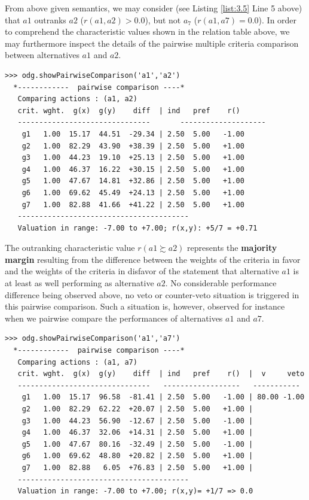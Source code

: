 From above given semantics, we may consider (see Listing \ref{list:3.5} Line 5 above) that $a1$ outranks $a2$ ($r(a1,a2) > 0.0$), but not $a_7$ ($r(a1,a7) = 0.0$). In order to comprehend the characteristic values shown in the relation table above, we may furthermore inspect the details of the pairwise multiple criteria comparison between alternatives $a1$ and $a2$.

\begin{lstlisting}[caption={Inspecting a pairwise multiple criteria comparison},label=list:3.6]
>>> odg.showPairwiseComparison('a1','a2')
  *------------  pairwise comparison ----*
   Comparing actions : (a1, a2)
   crit. wght.  g(x)  g(y)    diff  | ind   pref    r() 
   -------------------------------  	 --------------------
    g1   1.00  15.17  44.51  -29.34 | 2.50  5.00   -1.00 
    g2   1.00  82.29  43.90  +38.39 | 2.50  5.00   +1.00 
    g3   1.00  44.23  19.10  +25.13 | 2.50  5.00   +1.00 
    g4   1.00  46.37  16.22  +30.15 | 2.50  5.00   +1.00 
    g5   1.00  47.67  14.81  +32.86 | 2.50  5.00   +1.00 
    g6   1.00  69.62  45.49  +24.13 | 2.50  5.00   +1.00 
    g7   1.00  82.88  41.66  +41.22 | 2.50  5.00   +1.00 
   ----------------------------------------
   Valuation in range: -7.00 to +7.00; r(x,y): +5/7 = +0.71
\end{lstlisting}

The outranking characteristic value $r(a1 \succsim a2)$ represents the {\bf majority margin} resulting from the difference between the weights of the criteria in favor and the weights of the criteria in disfavor of the statement that alternative $a1$ is at least as well performing as alternative $a2$. No considerable performance difference being observed above, no veto or counter-veto situation is triggered in this pairwise comparison. Such a situation is, however, observed for instance when we pairwise compare the performances of alternatives $a1$ and $a7$.

\begin{lstlisting}
>>> odg.showPairwiseComparison('a1','a7')
  *------------  pairwise comparison ----*
   Comparing actions : (a1, a7)
   crit. wght.  g(x)  g(y)    diff  | ind   pref    r()  |  v     veto
   -------------------------------   ------------------   -----------
    g1   1.00  15.17  96.58  -81.41 | 2.50  5.00   -1.00 | 80.00 -1.00
    g2   1.00  82.29  62.22  +20.07 | 2.50  5.00   +1.00 | 
    g3   1.00  44.23  56.90  -12.67 | 2.50  5.00   -1.00 | 
    g4   1.00  46.37  32.06  +14.31 | 2.50  5.00   +1.00 | 
    g5   1.00  47.67  80.16  -32.49 | 2.50  5.00   -1.00 | 
    g6   1.00  69.62  48.80  +20.82 | 2.50  5.00   +1.00 | 
    g7   1.00  82.88   6.05  +76.83 | 2.50  5.00   +1.00 | 
   ----------------------------------------
   Valuation in range: -7.00 to +7.00; r(x,y)= +1/7 => 0.0
\end{lstlisting}

